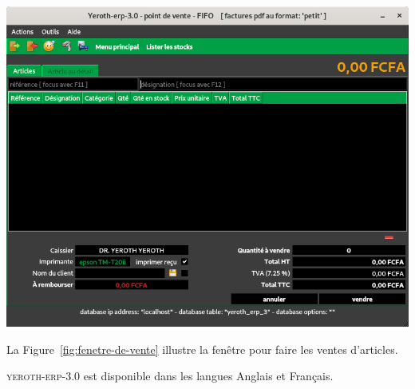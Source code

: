 \documentclass[a4paper, 10pt]{article}
\newcommand{\yeroth}{\textsc{yeroth-erp-3.0}\xspace}
\begin{document}
\begin{multicols}{2}
\begin{center}
\includegraphics[scale=0.33]{../images/yeren-fenetre-caissier.png}
\label{fig:fenetre-de-vente}
\end{center}


La Figure~\ref{fig:fenetre-de-vente} illustre la
fen\^etre pour faire les ventes d'articles.

\yeroth est disponible dans les langues Anglais et Fran\c{c}ais. 

\end{multicols}
\end{document}
